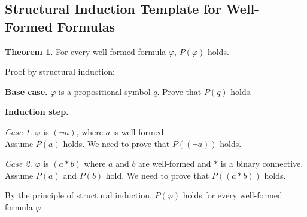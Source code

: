 \documentclass[11pt]{article}
\makeatletter
\theoremstyle{definition}
\newtheorem*{thm*}{Theorem}
\newenvironment{pf}[1][\proofname]{\par
  \pushQED{\qed}%
  \normalfont \topsep0\p@\relax
  \trivlist
  \item[\hskip\labelsep\itshape
  #1\@addpunct{.}]\ignorespaces
}{%
  \popQED\endtrivlist\@endpefalse
}
\makeatother
\begin{document}
\subsection{Structural Induction Template for Well-Formed Formulas}
\begin{thm*}
For every well-formed formula $\varphi$, $P(\varphi)$ holds. 
\end{thm*}
\begin{pf} 
Proof by structural induction:

{\bf Base case.} $\varphi$ is a propositional symbol $q$. Prove that $P(q)$ holds.

{\bf Induction step.} 

{\it Case 1.} $\varphi$ is $(\neg a)$, where $a$ is well-formed. \\
Assume $P(a)$ holds. We need to prove that $P((\neg a))$ holds.

{\it Case 2.} $\varphi$ is $(a * b)$ where $a$ and $b$ are well-formed and $*$ is a binary connective. \\
Assume $P(a)$ and $P(b)$ hold. We need to prove that $P((a * b))$ holds.

By the principle of structural induction, $P(\varphi)$ holds for every well-formed formula $\varphi$.
\end{pf}
\end{document}
